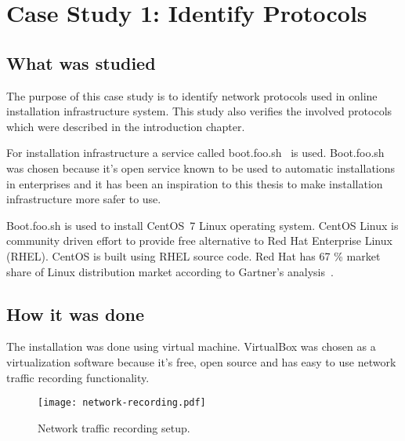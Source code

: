 



\section{Case Study 1: Identify Protocols}
\label{sec:casestudy1}

\subsection{What was studied}

The purpose of this case study is to identify network protocols used
in online installation infrastructure system. This study also verifies
the involved protocols which were described in the introduction
chapter.

For installation infrastructure a service called
boot.foo.sh~\cite{boot-foo-sh} is used. Boot.foo.sh was chosen because
it's open service known to be used to automatic installations in
enterprises and it has been an inspiration to this thesis to make
installation infrastructure more safer to use.

Boot.foo.sh is used to install CentOS~7 Linux operating system. CentOS
Linux is community driven effort to provide free alternative to Red
Hat Enterprise Linux (RHEL). CentOS is built using RHEL source
code. Red Hat has 67 \% market share of Linux distribution market
according to Gartner's analysis~\cite{gartner-redhat}.

\subsection{How it was done}

The installation was done using virtual machine. VirtualBox was chosen
as a virtualization software because it's free, open source and has
easy to use network traffic recording functionality.

\begin{figure}[h]
  \texttt{[image: network-recording.pdf]}
  \caption{Network traffic recording setup.\label{fig:network-recording}}
\end{figure}

